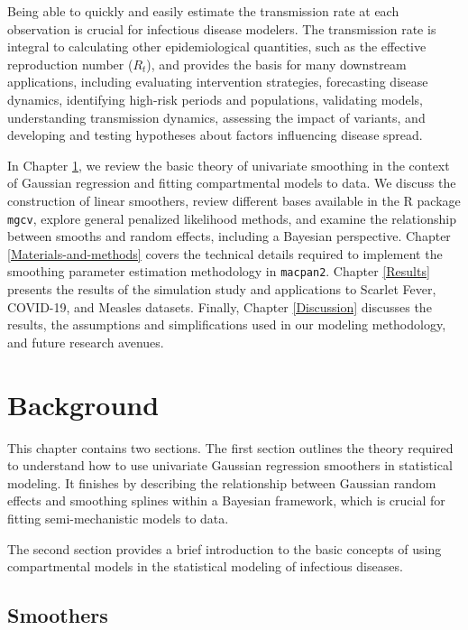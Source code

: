 \documentclass[
11pt, %
oneside, %
english, %
singlespacing, %
]{macthesis} %
\begin{document}
Being able to quickly and easily estimate the transmission rate at each observation is crucial for infectious disease modelers. The transmission rate is integral to calculating other epidemiological quantities, such as the effective reproduction number (\(R_t\)), and provides the basis for many downstream applications, including evaluating intervention strategies, forecasting disease dynamics, identifying high-risk periods and populations, validating models, understanding transmission dynamics, assessing the impact of variants, and developing and testing hypotheses about factors influencing disease spread.

In Chapter \ref{Background}, we review the basic theory of univariate smoothing in the context of Gaussian regression and fitting compartmental models to data. We discuss the construction of linear smoothers, review different bases available in the R package \texttt{mgcv}, explore general penalized likelihood methods, and examine the relationship between smooths and random effects, including a Bayesian perspective. Chapter \ref{Materials-and-methods} covers the technical details required to implement the smoothing parameter estimation methodology in \texttt{macpan2}. Chapter \ref{Results} presents the results of the simulation study and applications to Scarlet Fever, COVID-19, and Measles datasets. Finally, Chapter \ref{Discussion} discusses the results, the assumptions and simplifications used in our modeling methodology, and future research avenues.

\chapter{Background}\label{Background}

This chapter contains two sections. The first section outlines the theory required to understand how to use univariate Gaussian regression smoothers in statistical modeling. It finishes by describing the relationship between Gaussian random effects and smoothing splines within a Bayesian framework, which is crucial for fitting semi-mechanistic models to data.

The second section provides a brief introduction to the basic concepts of using compartmental models in the statistical modeling of infectious diseases.

\section{Smoothers}\label{Smoothers}
\end{document}
